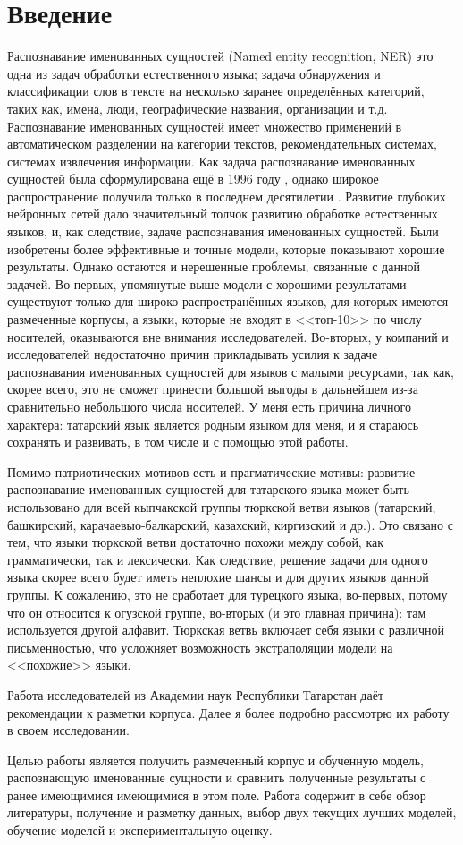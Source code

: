 \section{Введение}

Распознавание именованных сущностей (Named entity recognition, NER) это одна из задач обработки естественного языка; задача обнаружения и классификации слов в тексте на несколько заранее определённых категорий, таких как, имена, люди, географические названия, организации и т.д. Распознавание именованных сущностей имеет множество применений в автоматическом разделении на категории текстов, рекомендательных системах, системах извлечения информации. Как задача распознавание именованных сущностей была сформулирована ещё в 1996 году \cite{first_NER}, однако широкое распространение получила только в последнем десятилетии \cite{DBLP:journals/corr/abs-1812-09449}. Развитие глубоких нейронных сетей дало значительный толчок развитию обработке естественных языков, и, как следствие, задаче распознавания именованных сущностей. Были изобретены более эффективные и точные модели, которые показывают хорошие результаты. Однако остаются и нерешенные проблемы, связанные с данной задачей. Во-первых, упомянутые выше модели с хорошими результатами существуют только для широко распространённых языков, для которых имеются размеченные корпусы, а языки, которые не входят в <<топ-10>> по числу носителей, оказываются вне внимания исследователей. Во-вторых, у компаний и исследователей недостаточно причин прикладывать усилия к задаче распознавания именованных сущностей для языков с малыми ресурсами, так как, скорее всего, это не сможет принести большой выгоды в дальнейшем из-за сравнительно небольшого числа носителей. У меня есть причина личного характера: татарский язык является родным языком для меня, и я стараюсь сохранять и развивать, в том числе и с помощью этой работы.

Помимо патриотических мотивов есть и прагматические мотивы: развитие распознавание именованных сущностей для татарского языка может быть использовано для всей кыпчакской группы тюркской ветви языков (татарский, башкирский, карачаевыо-балкарский, казахский, киргизский и др.). Это связано с тем, что языки тюркской ветви достаточно похожи между собой, как грамматически, так и лексически. Как следствие, решение задачи для одного языка скорее всего будет иметь неплохие шансы и для других языков данной группы. К сожалению, это не сработает для турецкого языка, во-первых, потому что он относится к огузской группе, во-вторых (и это главная причина): там используется другой алфавит. Тюркская ветвь включает себя языки с различной письменностью, что усложняет возможность экстраполяции модели на <<похожие>> языки. %

Работа \cite{Nevzorova} исследователей из Академии наук Республики Татарстан даёт рекомендации к разметки корпуса. Далее я более подробно рассмотрю их работу в своем исследовании.

Целью работы является получить размеченный корпус и обученную модель, распознающую именованные сущности и сравнить полученные результаты с ранее имеющимися имеющимися в этом поле. Работа содержит в себе обзор литературы, получение и разметку данных, выбор двух текущих лучших моделей, обучение моделей и экспериментальную оценку.

